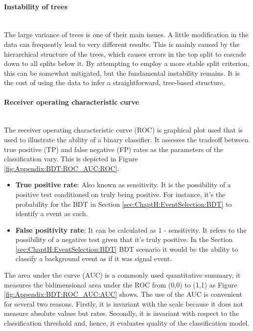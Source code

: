 \paragraph{Instability of trees}\mbox{}\\
The large variance of trees is one of their main issues. A little modification in the 
data can frequently lead to very different results. This is mainly caused by the
hierarchical structure of the trees, which causes errors in the top split to cascade 
down to all splits below it. By attempting to employ a more stable split criterion, 
this can be somewhat mitigated, but the fundamental instability remains. It is the 
cost of using the data to infer a straightforward, tree-based structure. 

\paragraph{Receiver operating characteristic curve}\mbox{}\\
The receiver operating characteristic curve (ROC) is graphical plot used
that is used to illustrate the ability of a binary classifier. It assesses the 
tradeoff between true positive (TP) and false negative (FP) rates as the parameters of the classification vary.
This is depicted in Figure \ref{fig:Appendix:BDT:ROC_AUC:ROC}. 
\begin{itemize}
	\item \textbf{True positive rate}: Also known as sensitivity. 
	It is the possibility of a positive test conditioned on truly being positive. For instance, it's the probability
	for the BDT in Section \ref{sec:ChaptH:EventSelection:BDT} to identify a \tHq event as such. 
	\item \textbf{False positivity rate}: It can be calculated as 1 - sensitivity. 
	It refers to the possibility of a negative test given that it's truly positive. In the Section \ref{sec:ChaptH:EventSelection:BDT}
	BDT scenario it would be the ability to classify a background event as if it was \tHq signal event.  
\end{itemize}

The area under the curve (AUC) is a commonly used quantitative summary, it measures the
bidimensional area under the ROC from (0,0) to (1,1) as Figure \ref{fig:Appendix:BDT:ROC_AUC:AUC} shows.
The use of the AUC is convenient for several two reasons. Firstly, it is invariant with the scale because it does
not measure absolute values but rates. Secondly, it is invariant with respect to the classification threshold and,
hence, it evaluates quality of the classification model.

